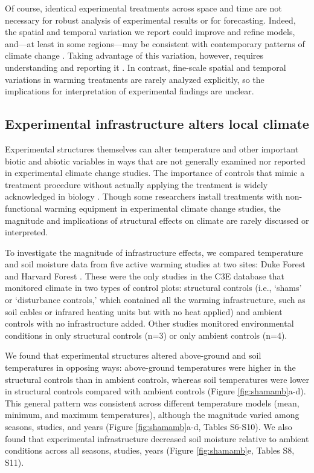 \documentclass{article}
\begin{document}
\par Of course, identical experimental treatments across space and time are not necessary for robust analysis of experimental results or for forecasting. Indeed, the spatial and temporal variation we report could improve and refine models, and---at least in some regions---may be consistent with contemporary patterns of climate change \citep{ipcc2013}. Taking advantage of this variation, however, requires understanding and reporting it \citep[e.g.,][]{milcu2016}. In contrast, fine-scale spatial and temporal variations in warming treatments are rarely analyzed explicitly, so the implications for interpretation of experimental findings are unclear.

\subsection* {Experimental infrastructure alters local climate}
Experimental structures themselves can alter temperature and other important biotic and abiotic variables in ways that are not generally examined nor reported in experimental climate change studies. The importance of controls that mimic a treatment procedure without actually applying the treatment is widely acknowledged in biology \citep[e.g.,][]{spector2001,johnson2002,quinn2002}. Though some researchers install treatments with non-functional warming equipment in experimental climate change studies, the magnitude and implications of structural effects on climate are rarely discussed or interpreted.
\par To investigate the magnitude of infrastructure effects, we compared temperature and soil moisture data from five active warming studies at two sites: Duke Forest and Harvard Forest \citep{farnsworth1995,clark2014b, marchin2015, pelini2011}. These were the only studies in the C3E database that monitored climate in two types of control plots: structural controls (i.e., `shams' or `disturbance controls,' which contained all the warming infrastructure, such as soil cables or infrared heating units but with no heat applied) and ambient controls with no infrastructure added. Other studies monitored environmental conditions in only structural controls (n=3) or only ambient controls (n=4).

\par We found that experimental structures altered above-ground and soil temperatures in opposing ways: above-ground temperatures were higher in the structural controls than in ambient controls, whereas soil temperatures were lower in structural controls compared with ambient controls (Figure \ref{fig:shamamb}a-d). This general pattern was consistent across different temperature models (mean, minimum, and maximum temperatures), although the magnitude varied among seasons, studies, and years (Figure \ref{fig:shamamb}a-d, Tables S6-S10). We also found that experimental infrastructure decreased soil moisture relative to ambient conditions across all seasons, studies, years (Figure \ref{fig:shamamb}e, Tables S8, S11). 
\end{document}
